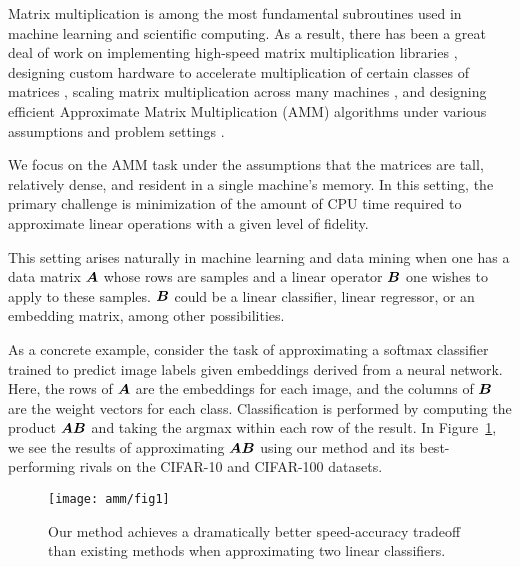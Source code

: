 
Matrix multiplication is among the most fundamental subroutines used in machine learning and scientific computing. As a result, there has been a great deal of work on implementing high-speed matrix multiplication libraries \cite{pytorch,eigen,tensorflow}, designing custom hardware to accelerate multiplication of certain classes of matrices \cite{eie,eyeriss,scnn,tpu}, scaling matrix multiplication across many machines \cite{distributedCoded, shortDot, entangledPolynomial, matmulCommunicationBounds}, and designing efficient Approximate Matrix Multiplication (AMM) algorithms under various assumptions and problem settings \cite{drineas_fast_2006,manne_fast_2014,ye_frequent_2016,mroueh_co-occuring_2016,bolt}.

We focus on the AMM task under the assumptions that the matrices are tall, relatively dense, and resident in a single machine's memory. In this setting, the primary challenge is minimization of the amount of CPU time required to approximate linear operations with a given level of fidelity.

This setting arises naturally in machine learning and data mining when one has a data matrix $\bm{A}$ whose rows are samples and a linear operator $\bm{B}$ one wishes to apply to these samples. $\bm{B}$ could be a linear classifier, linear regressor, or an embedding matrix, among other possibilities.

As a concrete example, consider the task of approximating a softmax classifier trained to predict image labels given embeddings derived from a neural network. Here, the rows of $\bm{A}$ are the embeddings for each image, and the columns of $\bm{B}$ are the weight vectors for each class. Classification is performed by computing the product $\bm{A}\bm{B}$ and taking the argmax within each row of the result.
In Figure~\ref{fig:fig1}, we see the results of approximating $\bm{A}\bm{B}$ using our method and its best-performing rivals \cite{hashjl, sparsePCA} on the CIFAR-10 and CIFAR-100 datasets.
\vspace{1mm}
\begin{figure}[h]
\begin{center}
\texttt{[image: amm/fig1]}
\caption{Our method achieves a dramatically better speed-accuracy tradeoff than existing methods when approximating two linear classifiers.}
\label{fig:fig1}
\end{center}
\end{figure}
\vspace{-1mm}

